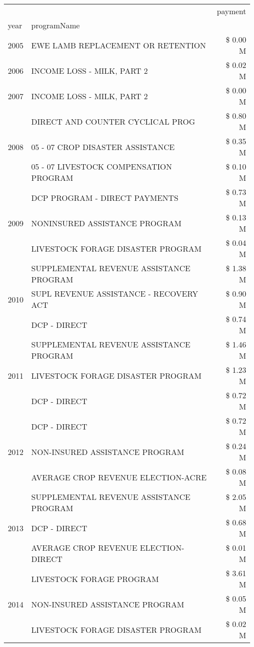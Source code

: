\begin{tabular}{llr}
\toprule
 &  & payment \\
year & programName &  \\
\midrule
2005 & EWE LAMB REPLACEMENT OR RETENTION & \$ 0.00 M \\
\cline{1-3}
2006 & INCOME LOSS - MILK, PART 2 & \$ 0.02 M \\
\cline{1-3}
2007 & INCOME LOSS - MILK, PART 2 & \$ 0.00 M \\
\cline{1-3}
\multirow[t]{3}{*}{2008} & DIRECT AND COUNTER CYCLICAL PROG & \$ 0.80 M \\
 & 05 - 07 CROP DISASTER ASSISTANCE & \$ 0.35 M \\
 & 05 - 07 LIVESTOCK COMPENSATION PROGRAM & \$ 0.10 M \\
\cline{1-3}
\multirow[t]{3}{*}{2009} & DCP PROGRAM - DIRECT PAYMENTS & \$ 0.73 M \\
 & NONINSURED ASSISTANCE PROGRAM & \$ 0.13 M \\
 & LIVESTOCK FORAGE DISASTER  PROGRAM & \$ 0.04 M \\
\cline{1-3}
\multirow[t]{3}{*}{2010} & SUPPLEMENTAL REVENUE ASSISTANCE PROGRAM & \$ 1.38 M \\
 & SUPL REVENUE ASSISTANCE - RECOVERY ACT & \$ 0.90 M \\
 & DCP - DIRECT & \$ 0.74 M \\
\cline{1-3}
\multirow[t]{3}{*}{2011} & SUPPLEMENTAL REVENUE ASSISTANCE PROGRAM & \$ 1.46 M \\
 & LIVESTOCK FORAGE DISASTER PROGRAM & \$ 1.23 M \\
 & DCP - DIRECT & \$ 0.72 M \\
\cline{1-3}
\multirow[t]{3}{*}{2012} & DCP - DIRECT & \$ 0.72 M \\
 & NON-INSURED ASSISTANCE PROGRAM & \$ 0.24 M \\
 & AVERAGE CROP REVENUE ELECTION-ACRE & \$ 0.08 M \\
\cline{1-3}
\multirow[t]{3}{*}{2013} & SUPPLEMENTAL REVENUE ASSISTANCE PROGRAM & \$ 2.05 M \\
 & DCP - DIRECT & \$ 0.68 M \\
 & AVERAGE CROP REVENUE ELECTION-DIRECT & \$ 0.01 M \\
\cline{1-3}
\multirow[t]{3}{*}{2014} & LIVESTOCK FORAGE PROGRAM & \$ 3.61 M \\
 & NON-INSURED ASSISTANCE PROGRAM & \$ 0.05 M \\
 & LIVESTOCK FORAGE DISASTER PROGRAM & \$ 0.02 M \\

\end{tabular}
